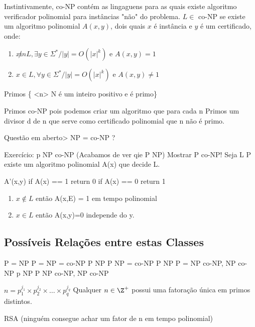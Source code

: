 \documentclass[a4paper,oneside,article,table]{article}
\begin{document}
        Instintivamente, co-NP contém as lingaguens para as quais existe algoritmo verificador polinomial para instâncias "não" do problema.
        $L \in $ co-NP se existe um algoritmo polinomial $A(x,y)$, dois quais $x$ é instância e $y$ é um certificado, onde:
        \begin{enumerate}
                \item $x \not in L, \exists y \in \Sigma^* / |y| = O(|x|^k)$ e $A(x,y) = 1$
                \item $x \in L, \forall y \in \Sigma^* / |y| = O(|x|^k)$ e $A(x,y) \neq 1$
        \end{enumerate}

        Primos \{ <n> N é um inteiro positivo e é primo\}

        Primos \in co-NP pois podemos criar um algoritmo que para cada n \neq Primos \rightarrow \exists um divisor d de n que serve como certificado polinomial que n não é primo.

        Questão em aberto> NP = co-NP ?

        Exercício: p \subseteq NP \cap co-NP (Acabamos de ver qie P \subseteq NP)
        Mostrar P \subseteq co-NP! Seja L \in P \rightarrow existe um algoritmo polinomial A(x) que decide L.

        A'(x,y)
            if A(x) == 1 return 0
            if A(x) == 0 return 1

        \begin{enumerate}
            \item $x \notin L$ então A(x,E) = 1 em tempo polinomial
            \item $x \in L$ então A(x,y)=0 independe do y.
        \end{enumerate}

        \subsection{Possíveis Relações entre estas Classes}

        P = NP \rightarrow P = NP = co-NP
        P \neq NP \rightarrow P \in NP = co-NP
        P \neq NP \rightarrow P = NP \bigcap co-NP, NP \neq co-NP
        p \neq NP \rightarrow P \subset NP \bigcap co-NP, NP \neq co-NP

        $n = p_{1}^{j_1} \times p_{2}^{j_2} \times \ldots \times p_{q}^{j_q}$
        Qualquer $n \in \Z^+$ possui uma fatoração única em primos distintos.

        RSA (ninguém consegue achar um fator de n em tempo polinomial)
\end{document}
